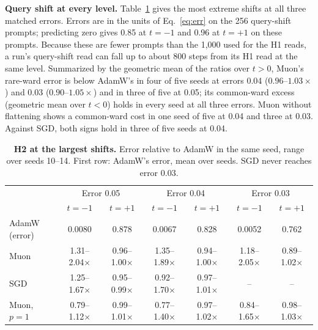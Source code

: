 \textbf{Query shift at every level.} Table~\ref{tab:h2} gives the most extreme shifts at all three matched errors. Errors are in the units of Eq.~\eqref{eq:err} on the 256 query-shift prompts; predicting zero gives 0.85 at $t=-1$ and 0.96 at $t=+1$ on these prompts. Because these are fewer prompts than the 1,000 used for the H1 reads, a run's query-shift read can fall up to about 800 steps from its H1 read at the same level. Summarized by the geometric mean of the ratios over $t>0$, Muon's rare-ward error is below AdamW's in four of five seeds at errors 0.04 ($0.96$--$1.03\times$) and 0.03 ($0.90$--$1.05\times$) and in three of five at 0.05; its common-ward excess (geometric mean over $t<0$) holds in every seed at all three errors. Muon without flattening shows a common-ward cost in one seed of five at 0.04 and three at 0.03. Against SGD, both signs hold in three of five seeds at 0.04.

\begin{table}[h]
\caption{\textbf{H2 at the largest shifts.} Error relative to AdamW in the same seed, range over seeds 10--14. First row: AdamW's error, mean over seeds. SGD never reaches error 0.03.}
\label{tab:h2}
\vspace{2pt}
\centering\footnotesize
\setlength{\tabcolsep}{4pt}
\begin{tabular}{@{}lcccccc@{}}
\toprule
 & \multicolumn{2}{c}{Error 0.05} & \multicolumn{2}{c}{Error 0.04} & \multicolumn{2}{c}{Error 0.03} \\
 & $t=-1$ & $t=+1$ & $t=-1$ & $t=+1$ & $t=-1$ & $t=+1$ \\
\midrule
AdamW (error) & 0.0080 & 0.878 & 0.0067 & 0.828 & 0.0052 & 0.762 \\
Muon & 1.31--2.04$\times$ & 0.96--1.00$\times$ & 1.35--1.89$\times$ & 0.94--1.00$\times$ & 1.18--2.05$\times$ & 0.89--1.02$\times$ \\
SGD & 1.25--1.67$\times$ & 0.95--0.99$\times$ & 0.92--1.70$\times$ & 0.97--1.01$\times$ & -- & -- \\
Muon, $p=1$ & 0.79--1.12$\times$ & 0.99--1.01$\times$ & 0.77--1.40$\times$ & 0.97--1.02$\times$ & 0.84--1.65$\times$ & 0.98--1.03$\times$ \\
\bottomrule
\end{tabular}
\end{table}
